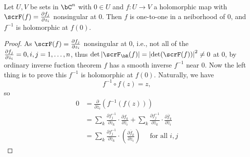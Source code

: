 \documentclass[lang=cn,12pt,fontset=none,a4paper]{beautybook}
\begin{document}
\begin{theorem}
   Let $U,V$ be sets in $\bC^n$ with $0\in U$ and $f: U\to V$ a holomorphic map with $\scrF (f)=\Diff[f_j]{z_i}$ nonsingular at $0$. Then $f$ is one-to-one in a neiborhood of $0$, and $f^{-1}$ is holomorphic at $f(0)$.
\end{theorem}
\begin{proof}
   As $\scrF (f)=\Diff[f_j]{z_i}$ nonsingular at $0$, i.e., not all of the $\Diff[f_j]{z_i}=0, i,j=1,\dots,n$,  thus $\det \abs{\scrF_\bR (f)}=\abs{\det(\scrF(f))}^2\neq 0$ at $0$, by ordinary inverse fuction theorem $f$ has a smooth inverse $f^{-1}$ near $0$. Now the left  thing is to prove this $f^{-1}$ is holomorphic at $f(0)$. Naturally, we have
   \[f^{-1} \circ f (z)=z,\]
   so
   \[
      \begin{aligned}
         0 & =\frac{\partial}{\partial \bar{z}_i}\left(f^{-1}(f(z))\right)                                                                                                                                        \\
           & =\sum_k \frac{\partial f_j^{-1}}{\partial z_k} \cdot \frac{\partial f_k}{\partial \bar{z}_i}+\sum_k \frac{\partial f_j^{-1}}{\partial \bar{z}_k} \cdot \frac{\partial \bar{f}_k}{\partial \bar{z}_i} \\
           & =\sum_k \frac{\partial f_j^{-1}}{\partial \bar{z}_k} \cdot\left(\frac{\overline{\partial f_k}}{\partial z_i}\right) \quad \text { for all } i, j
      \end{aligned}\]
\end{proof}
\end{document}
